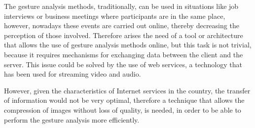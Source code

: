 The gesture analysis methods, traditionally, can be used in situations like job interviews or business meetings where participants are in the same place, however, nowadays these events are carried out online, thereby decreasing the perception of those involved. Therefore arises the need of a tool or architecture that allows the use of gesture analysis methods online, but this task is not trivial, because it requires mechanisms for exchanging data between the client and the server. This issue could be solved by the use of web services, a technology that has been used for streaming video and audio.

However, given the characteristics of Internet services in the country, the transfer of information would not be very optimal, therefore a technique that allows the compression of images without loss of quality, is needed, in order to be able to perform the gesture analysis more efficiently.
